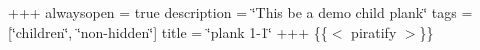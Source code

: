 +++ alwaysopen = true description = \char`\"{}\+This be a demo child plank\char`\"{} tags = \mbox{[}\char`\"{}children\char`\"{}, \char`\"{}non-\/hidden\char`\"{}\mbox{]} title = \char`\"{}plank 1-\/1\char`\"{} +++ \{\{$<$ piratify $>$\}\} 